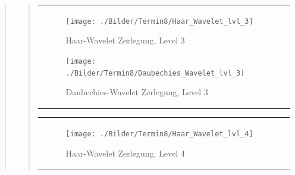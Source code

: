 \begin{quote}
\begin{quote}
\begin{center}
\begin{tabular}{ll}
                \hspace{-12em}
                    \begin{minipage}{0.6\textwidth}
    
                        \begin{figure}[H]
                            \label{fig:}
                            \texttt{[image: ./Bilder/Termin8/Haar\_Wavelet\_lvl\_3]}
                            \caption{Haar-Wavelet Zerlegung, Level 3}
                        \end{figure}
    
                    \end{minipage}
                    \begin{minipage}{0.6\textwidth}
    
                        \begin{figure}[H]
                            \label{fig:}
                            \texttt{[image: ./Bilder/Termin8/Daubechies\_Wavelet\_lvl\_3]}
                            \caption{Daubechies-Wavelet Zerlegung, Level 3}
                        \end{figure}
                    \vspace{-1.5em}
    
                    \end{minipage}
    
                \end{tabular}
                \end{center}
    
                
                
        \begin{center}
                \begin{tabular}{ll}
    
                \hspace{-12em}
                    \begin{minipage}{0.6\textwidth}
    
                        \begin{figure}[H]
                            \label{fig:}
                            \texttt{[image: ./Bilder/Termin8/Haar\_Wavelet\_lvl\_4]}
                            \caption{Haar-Wavelet Zerlegung, Level 4}
                        \end{figure}
    

\end{minipage}
\end{tabular}
\end{center}
\end{quote}
\end{quote}
